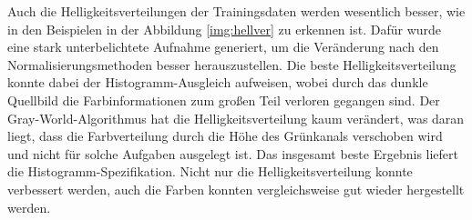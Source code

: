 Auch die Helligkeitsverteilungen der Trainingsdaten werden wesentlich besser, wie in den Beispielen in der Abbildung \ref{img:hellver} zu erkennen ist. Dafür wurde eine stark unterbelichtete Aufnahme generiert, um die Veränderung nach den Normalisierungsmethoden besser herauszustellen. Die beste Helligkeitsverteilung konnte dabei der Histogramm-Ausgleich aufweisen, wobei durch das dunkle Quellbild die Farbinformationen zum großen Teil verloren gegangen sind. Der Gray-World-Algorithmus hat die Helligkeitsverteilung kaum verändert, was daran liegt, dass die Farbverteilung durch die Höhe des Grünkanals verschoben wird und nicht für solche Aufgaben ausgelegt ist. Das insgesamt beste Ergebnis liefert die Histogramm-Spezifikation. Nicht nur die Helligkeitsverteilung konnte verbessert werden, auch die Farben konnten vergleichsweise gut wieder hergestellt werden.
